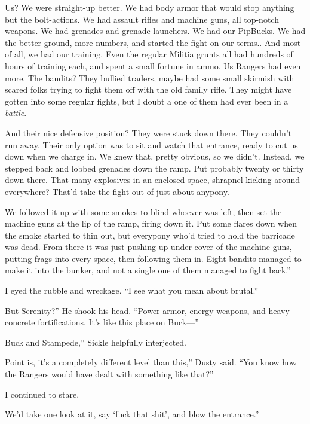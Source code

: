 \leavevmode{}Us? We were straight-up better. We had body armor that would stop anything but the bolt-actions. We had assault rifles and machine guns, all top-notch weapons. We had grenades and grenade launchers. We had our PipBucks. We had the better ground, more numbers, and started the fight on our terms.. And most of all, we had our training. Even the regular Militia grunts all had hundreds of hours of training each, and spent a small fortune in ammo. Us Rangers had even more. The bandits? They bullied traders, maybe had some small skirmish with scared folks trying to fight them off with the old family rifle. They might have gotten into some regular fights, but I doubt a one of them had ever been in a \textit{battle}.

\leavevmode{}And their nice defensive position? They were stuck down there. They couldn’t run away. Their only option was to sit and watch that entrance, ready to cut us down when we charge in. We knew that, pretty obvious, so we didn’t. Instead, we stepped back and lobbed grenades down the ramp. Put probably twenty or thirty down there. That many explosives in an enclosed space, shrapnel kicking around everywhere? That’d take the fight out of just about anypony.

\leavevmode{}We followed it up with some smokes to blind whoever was left, then set the machine guns at the lip of the ramp, firing down it. Put some flares down when the smoke started to thin out, but everypony who’d tried to hold the barricade was dead. From there it was just pushing up under cover of the machine guns, putting frags into every space, then following them in. Eight bandits managed to make it into the bunker, and not a single one of them managed to fight back.”

I eyed the rubble and wreckage. “I see what you mean about brutal.”

\leavevmode{}But Serenity?” He shook his head. “Power armor, energy weapons, and heavy concrete fortifications. It’s like this place on Buck—”

\leavevmode{}Buck and Stampede,” Sickle helpfully interjected.

\leavevmode{}Point is, it’s a completely different level than this,” Dusty said. “You know how the Rangers would have dealt with something like that?”

I continued to stare.

\leavevmode{}We’d take one look at it, say ‘fuck that shit’, and blow the entrance.”


